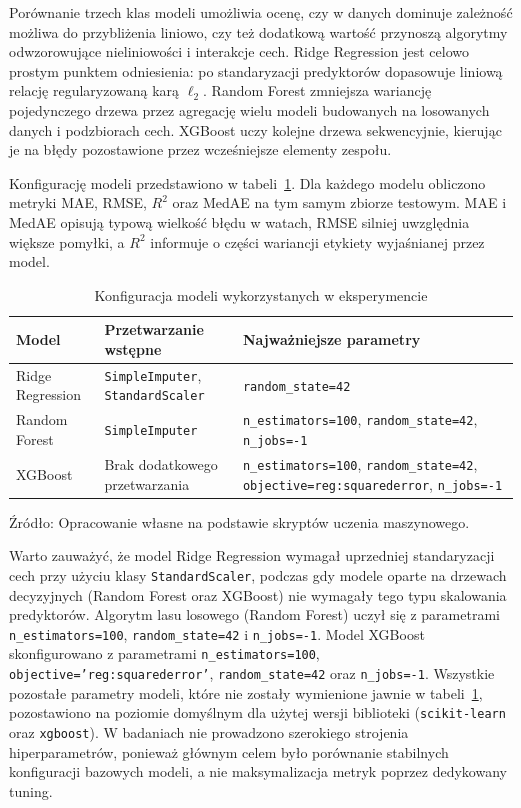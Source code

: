 Porównanie trzech klas modeli umożliwia ocenę, czy w danych dominuje zależność możliwa do przybliżenia liniowo, czy też dodatkową wartość przynoszą algorytmy odwzorowujące nieliniowości i interakcje cech. Ridge Regression jest celowo prostym punktem odniesienia: po standaryzacji predyktorów dopasowuje liniową relację regularyzowaną karą $\ell_2$. Random Forest zmniejsza wariancję pojedynczego drzewa przez agregację wielu modeli budowanych na losowanych danych i podzbiorach cech. XGBoost uczy kolejne drzewa sekwencyjnie, kierując je na błędy pozostawione przez wcześniejsze elementy zespołu.

Konfigurację modeli przedstawiono w tabeli~\ref{tab:konfiguracja_modeli}. Dla każdego modelu obliczono metryki MAE, RMSE, $R^2$ oraz MedAE na tym samym zbiorze testowym. MAE i MedAE opisują typową wielkość błędu w watach, RMSE silniej uwzględnia większe pomyłki, a $R^2$ informuje o części wariancji etykiety wyjaśnianej przez model.

\begin{table}[htbp]
\centering
\caption{Konfiguracja modeli wykorzystanych w eksperymencie}
\label{tab:konfiguracja_modeli}
\small
\begin{tabular}{|>{\raggedright\arraybackslash}p{2.8cm}|>{\raggedright\arraybackslash}p{3.8cm}|>{\raggedright\arraybackslash}p{6.8cm}|}
\hline
\textbf{Model} & \textbf{Przetwarzanie wstępne} & \textbf{Najważniejsze parametry} \\ \hline
Ridge Regression & \texttt{SimpleImputer}, \texttt{StandardScaler} & \texttt{random\_state=42} \\ \hline
Random Forest & \texttt{SimpleImputer} & \texttt{n\_estimators=100}, \texttt{random\_state=42}, \texttt{n\_jobs=-1} \\ \hline
XGBoost & Brak dodatkowego przetwarzania & \texttt{n\_estimators=100}, \texttt{random\_state=42}, \texttt{objective=reg:squarederror}, \texttt{n\_jobs=-1} \\ \hline
\end{tabular}
\par\smallskip
\raggedright\footnotesize Źródło: Opracowanie własne na podstawie skryptów uczenia maszynowego.
\end{table}

Warto zauważyć, że model Ridge Regression wymagał uprzedniej standaryzacji cech przy użyciu klasy \texttt{StandardScaler}, podczas gdy modele oparte na drzewach decyzyjnych (Random Forest oraz XGBoost) nie wymagały tego typu skalowania predyktorów. Algorytm lasu losowego (Random Forest) uczył się z parametrami \texttt{n\_estimators=100}, \texttt{random\_state=42} i \texttt{n\_jobs=-1}. Model XGBoost skonfigurowano z parametrami \texttt{n\_estimators=100}, \texttt{objective='reg:squarederror'}, \texttt{random\_state=42} oraz \texttt{n\_jobs=-1}. Wszystkie pozostałe parametry modeli, które nie zostały wymienione jawnie w tabeli~\ref{tab:konfiguracja_modeli}, pozostawiono na poziomie domyślnym dla użytej wersji biblioteki (\texttt{scikit-learn} oraz \texttt{xgboost}). W badaniach nie prowadzono szerokiego strojenia hiperparametrów, ponieważ głównym celem było porównanie stabilnych konfiguracji bazowych modeli, a nie maksymalizacja metryk poprzez dedykowany tuning.

